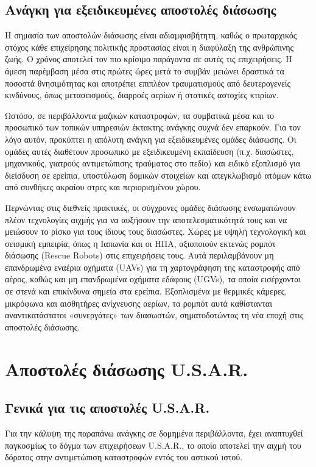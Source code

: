 \subsection{Ανάγκη για εξειδικευμένες αποστολές διάσωσης}  
Η σημασία των αποστολών διάσωσης είναι αδιαμφισβήτητη, καθώς ο πρωταρχικός στόχος κάθε επιχείρησης πολιτικής προστασίας είναι η διαφύλαξη της ανθρώπινης ζωής. Ο χρόνος αποτελεί τον πιο κρίσιμο παράγοντα σε αυτές τις επιχειρήσεις. Η άμεση παρέμβαση μέσα στις πρώτες ώρες μετά το συμβάν μειώνει δραστικά τα ποσοστά θνησιμότητας και αποτρέπει επιπλέον τραυματισμούς από δευτερογενείς κινδύνους, όπως μετασεισμούς, διαρροές αερίων ή στατικές αστοχίες κτιρίων.

\par Ωστόσο, σε περιβάλλοντα μαζικών καταστροφών, τα συμβατικά μέσα και το προσωπικό των τοπικών υπηρεσιών έκτακτης ανάγκης συχνά δεν επαρκούν. Για τον λόγο αυτόν, προκύπτει η απόλυτη ανάγκη για εξειδικευμένες ομάδες διάσωσης. Οι ομάδες αυτές διαθέτουν προσωπικό με εξειδικευμένη εκπαίδευση (π.χ. διασώστες, μηχανικούς, γιατρούς αντιμετώπισης τραύματος στο πεδίο) και ειδικό εξοπλισμό για διείσδυση σε ερείπια, υποστύλωση δομικών στοιχείων και απεγκλωβισμό ατόμων κάτω από συνθήκες ακραίου στρες και περιορισμένου χώρου.

\par Περνώντας στις διεθνείς πρακτικές, οι σύγχρονες ομάδες διάσωσης ενσωματώνουν πλέον τεχνολογίες αιχμής για να αυξήσουν την αποτελεσματικότητά τους και να μειώσουν το ρίσκο για τους ίδιους τους διασώστες. Χώρες με υψηλή τεχνολογική και σεισμική εμπειρία, όπως η Ιαπωνία και οι ΗΠΑ, αξιοποιούν εκτενώς ρομπότ διάσωσης (Rescue Robots) στις επιχειρήσεις τους. Αυτά περιλαμβάνουν μη επανδρωμένα εναέρια οχήματα (UAVs) για τη χαρτογράφηση της καταστροφής από αέρος, καθώς και μη επανδρωμένα οχήματα εδάφους (UGVs), τα οποία εισέρχονται σε στενά και επικίνδυνα σημεία στα ερείπια. Εξοπλισμένα με θερμικές κάμερες, μικρόφωνα και αισθητήρες ανίχνευσης αερίων, τα ρομπότ αυτά καθίστανται αναντικατάστατοι «συνεργάτες» των διασωστών, σηματοδοτώντας τη νέα εποχή στις αποστολές διάσωσης.



\section{Αποστολές διάσωσης U.S.A.R.}

\subsection{Γενικά για τις αποστολές U.S.A.R.}
Για την κάλυψη της παραπάνω ανάγκης σε δομημένα περιβάλλοντα, έχει αναπτυχθεί παγκοσμίως το δόγμα των επιχειρήσεων U.S.A.R., το οποίο αποτελεί την αιχμή του δόρατος στην αντιμετώπιση καταστροφών εντός του αστικού ιστού.


